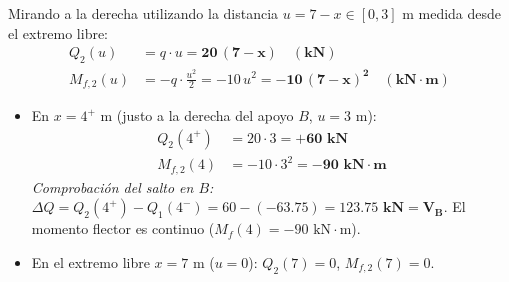 {    
    Mirando a la derecha utilizando la distancia $u = 7 - x \in [0, 3]\text{ m}$ medida desde el extremo libre:
    \begin{align}
        Q_2(u)    & = q \cdot u = \mathbf{20\,(7 - x) \quad (\text{kN})}                                     \\
        M_{f,2}(u)& = -q \cdot \frac{u^2}{2} = -10\,u^2 = \mathbf{-10\,(7 - x)^2 \quad (\text{kN}\cdot\text{m})}
    \end{align}
    \begin{itemize}
        \item En $x = 4^+\text{ m}$ (justo a la derecha del apoyo $B$, $u = 3\text{ m}$):
              \begin{align}
                  Q_2(4^+)   & = 20 \cdot 3 = \mathbf{+60\text{ kN}} \\
                  M_{f,2}(4) & = -10 \cdot 3^2 = \mathbf{-90\text{ kN}\cdot\text{m}}
              \end{align}
              \textit{Comprobación del salto en $B$:} $\Delta Q = Q_2(4^+) - Q_1(4^-) = 60 - (-63.75) = \mathbf{123.75\text{ kN} = V_B}$. El momento flector es continuo ($M_f(4) = -90\text{ kN}\cdot\text{m}$).
        \item En el extremo libre $x = 7\text{ m}$ ($u = 0$): $Q_2(7) = 0$, \quad $M_{f,2}(7) = 0$.
    \end{itemize}

    \begin{center}
\end{center}}

